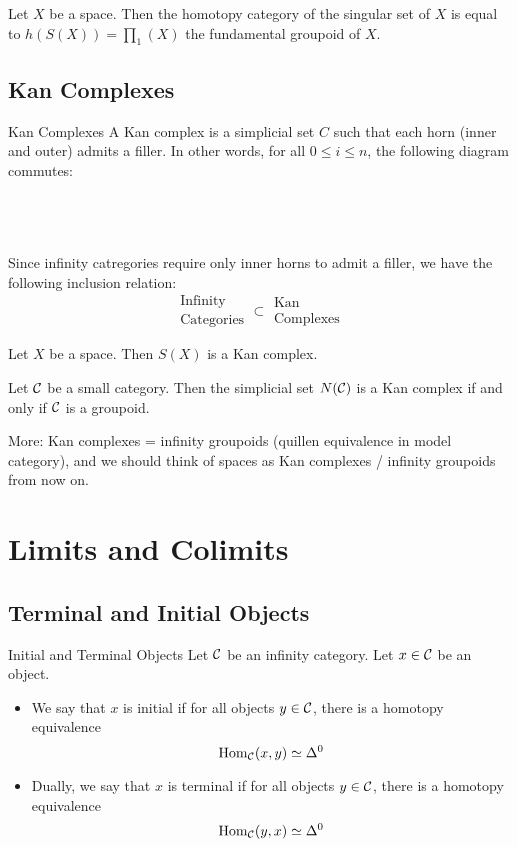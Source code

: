 \documentclass[a4paper]{article}
\begin{document}
\begin{prp}{}{} Let $X$ be a space. Then the homotopy category of the singular set of $X$ is equal to $h(S(X))=\prod_1(X)$ the fundamental groupoid of $X$. 
\end{prp}

\subsection{Kan Complexes}
\begin{defn}{Kan Complexes}{} A Kan complex is a simplicial set $C$ such that each horn (inner and outer) admits a filler. In other words, for all $0\leq i\leq n$, the following diagram commutes: \\~\\
\\~\\
\end{defn}

Since infinity catregories require only inner horns to admit a filler, we have the following inclusion relation: $$\substack{\text{Infinity}\\\text{Categories}}\subset\substack{\text{Kan}\\\text{Complexes}}$$

\begin{prp}{}{} Let $X$ be a space. Then $S(X)$ is a Kan complex. 
\end{prp}

\begin{thm}{}{} Let $\mathcal{C}$ be a small category. Then the simplicial set $N(\mathcal{C})$ is a Kan complex if and only if $\mathcal{C}$ is a groupoid. 
\end{thm}

More: Kan complexes = infinity groupoids (quillen equivalence in model category), and we should think of spaces as Kan complexes / infinity groupoids from now on. 

\pagebreak
\section{Limits and Colimits}
\subsection{Terminal and Initial Objects}
\begin{defn}{Initial and Terminal Objects}{} Let $\mathcal{C}$ be an infinity category. Let $x\in\mathcal{C}$ be an object. 
\begin{itemize}
\item We say that $x$ is initial if for all objects $y\in\mathcal{C}$, there is a homotopy equivalence $$\operatorname{Hom}_{\mathcal{C}}(x,y)\simeq\Delta^0$$
\item Dually, we say that $x$ is terminal if for all objects $y\in\mathcal{C}$, there is a homotopy equivalence $$\operatorname{Hom}_{\mathcal{C}}(y,x)\simeq\Delta^0$$
\end{itemize}
\end{defn}
\end{document}
